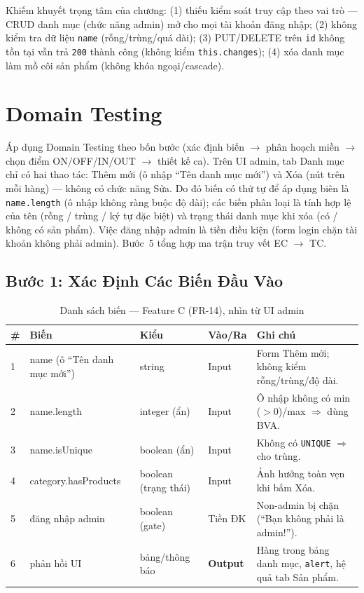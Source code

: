 \documentclass[12pt, a4paper]{report}
\begin{document}
\begin{notebox}
Khiếm khuyết trọng tâm của chương: (1) thiếu kiểm soát truy cập theo vai trò — CRUD
danh mục (chức năng admin) mở cho mọi tài khoản đăng nhập; (2) không kiểm tra dữ liệu
\texttt{name} (rỗng/trùng/quá dài); (3) PUT/DELETE trên \texttt{id} không tồn tại vẫn
trả \texttt{200} thành công (không kiểm \texttt{this.changes}); (4) xóa danh mục làm
mồ côi sản phẩm (không khóa ngoại/cascade).
\end{notebox}

\section{Domain Testing}

Áp dụng Domain Testing theo bốn bước (xác định biến $\to$ phân hoạch miền
$\to$ chọn điểm ON/OFF/IN/OUT $\to$ thiết kế ca). Trên UI admin, tab Danh mục chỉ có hai thao
tác: Thêm mới (ô nhập ``Tên danh mục mới'') và Xóa (nút trên mỗi hàng) ---
không có chức năng Sửa. Do đó biến có thứ tự để áp dụng biên là \texttt{name.length}
(ô nhập không ràng buộc độ dài); các biến phân loại là tính hợp lệ của tên (rỗng / trùng /
ký tự đặc biệt) và trạng thái danh mục khi xóa (có / không có sản phẩm). Việc đăng nhập
admin là tiền điều kiện (form login chặn tài khoản không phải admin). Bước~5 tổng hợp ma
trận truy vết EC $\to$ TC.

\subsection{Bước 1: Xác Định Các Biến Đầu Vào}
\begin{table}[H]
    \centering
    \caption{Danh sách biến — Feature C (FR-14), nhìn từ UI admin}
    \begin{tabularx}{\linewidth}{C{0.5cm} L{3.2cm} L{2.6cm} C{1.8cm} X}
        \toprule
        \textbf{\#} & \textbf{Biến} & \textbf{Kiểu} & \textbf{Vào/Ra} & \textbf{Ghi chú} \\
         & name (ô ``Tên danh mục mới'') & string & Input & Form Thêm mới; không kiểm rỗng/trùng/độ dài. \\
        2 & name.length & integer (ẩn) & Input & Ô nhập không có min ($>0$)/max $\Rightarrow$ dùng BVA. \\
        3 & name.isUnique & boolean (ẩn) & Input & Không có \texttt{UNIQUE} $\Rightarrow$ cho trùng. \\
        4 & category.hasProducts & boolean (trạng thái) & Input & Ảnh hưởng toàn vẹn khi bấm Xóa. \\
        5 & đăng nhập admin & boolean (gate) & Tiền ĐK & Non-admin bị chặn (``Bạn không phải là admin!''). \\
        6 & phản hồi UI & bảng/thông báo & \textbf{Output} & Hàng trong bảng danh mục, \texttt{alert}, hệ quả tab Sản phẩm. \\
        \bottomrule
    \end{tabularx}
\end{table}
\end{document}
